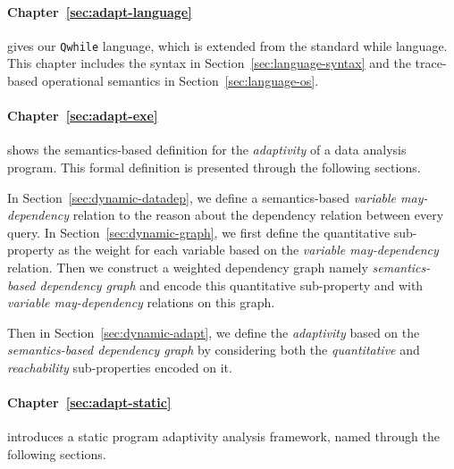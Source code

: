 \begin{enumerate}
 
 \paragraph*{Chapter~\ref{sec:adapt-language}} gives our
 {\tt Qwhile} language, which is extended from the standard while language. This chapter includes the syntax in Section~\ref{sec:language-syntax}
 and the trace-based operational semantics in Section~\ref{sec:language-os}.
 
 \paragraph*{Chapter~\ref{sec:adapt-exe}} shows the semantics-based definition for
 the \emph{adaptivity} of a data analysis program.
 This formal definition is presented through the following sections. 
%

 In Section~\ref{sec:dynamic-datadep}, we define a semantics-based \emph{variable may-dependency} relation to the reason about the dependency relation between every query.
%
 In Section~\ref{sec:dynamic-graph}, we first define the quantitative sub-property as the weight for each variable
 based on the \emph{variable may-dependency} relation.
 Then we construct a weighted dependency graph
 namely \emph{semantics-based dependency graph} and encode this quantitative sub-property and with \emph{variable may-dependency} relations on this graph.

 Then in Section~\ref{sec:dynamic-adapt}, we define the \emph{adaptivity} 
based on the \emph{semantics-based dependency graph} by considering both the \emph{quantitative} and \emph{reachability} sub-properties encoded on it.

 \paragraph*{Chapter~\ref{sec:adapt-static}} introduces a static program adaptivity analysis framework, named {\THESYSTEM} through the following sections.


\end{enumerate}

